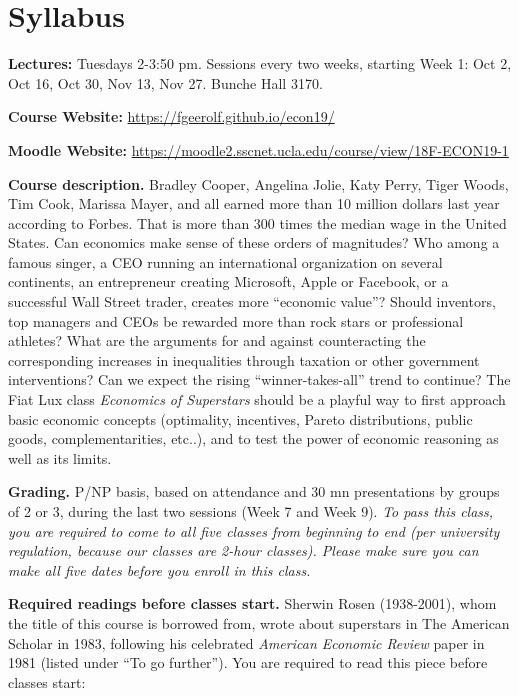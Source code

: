 \documentclass[]{book}
\theoremstyle{definition}
\theoremstyle{definition}
\theoremstyle{definition}
\theoremstyle{remark}
\begin{document}
\chapter*{Syllabus}\label{syllabus}

\textbf{Lectures:} Tuesdays 2-3:50 pm. Sessions every two weeks,
starting Week 1: Oct 2, Oct 16, Oct 30, Nov 13, Nov 27. Bunche Hall
3170.

\textbf{Course Website:} \url{https://fgeerolf.github.io/econ19/}

\textbf{Moodle Website:}
\url{https://moodle2.sscnet.ucla.edu/course/view/18F-ECON19-1}

\textbf{Course description.} Bradley Cooper, Angelina Jolie, Katy Perry,
Tiger Woods, Tim Cook, Marissa Mayer, and all earned more than 10
million dollars last year according to Forbes. That is more than 300
times the median wage in the United States. Can economics make sense of
these orders of magnitudes? Who among a famous singer, a CEO running an
international organization on several continents, an entrepreneur
creating Microsoft, Apple or Facebook, or a successful Wall Street
trader, creates more ``economic value''? Should inventors, top managers
and CEOs be rewarded more than rock stars or professional athletes? What
are the arguments for and against counteracting the corresponding
increases in inequalities through taxation or other government
interventions? Can we expect the rising ``winner-takes-all'' trend to
continue? The Fiat Lux class \emph{Economics of Superstars} should be a
playful way to first approach basic economic concepts (optimality,
incentives, Pareto distributions, public goods, complementarities,
etc..), and to test the power of economic reasoning as well as its
limits.

\textbf{Grading.} P/NP basis, based on attendance and 30 mn
presentations by groups of 2 or 3, during the last two sessions (Week 7
and Week 9). \emph{To pass this class, you are required to come to all
five classes from beginning to end (per university regulation, because
our classes are 2-hour classes). Please make sure you can make all five
dates before you enroll in this class.}

\textbf{Required readings before classes start.} Sherwin Rosen
(1938-2001), whom the title of this course is borrowed from, wrote about
superstars in The American Scholar in 1983, following his celebrated
\emph{American Economic Review} paper in 1981 (listed under ``To go
further''). You are required to read this piece before classes start:
\end{document}
